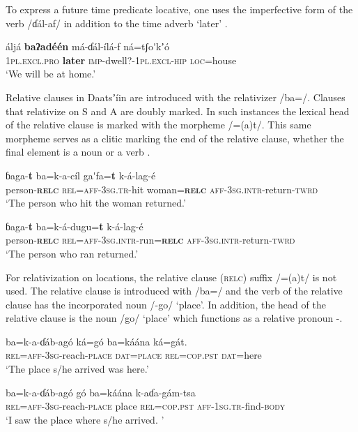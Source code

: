 \documentclass[output=paper]{langsci/langscibook}
\begin{document}
To express a future time predicate locative, one uses the imperfective form of the verb /ɗál-af/ in addition to the time adverb ‘later’ .

\ea\label{ex:ahlandc:81}
\gll
áljá    \textbf{baʔadéén}   má-ɗál-ílá-f                   ná=tʃo\'{ }kʼ\'{o} \\
\textsc{1pl.excl.pro}   \textbf{later}  \textsc{imp}{}-dwell?-\textsc{1pl.excl-hip} \textsc{loc}=house\\
\glt
‘We will be at home.’
\z

Relative clauses in Daatsʼíin are introduced with the relativizer /ba=/. Clauses that relativize on S and A are doubly marked. In such instances the lexical head of the relative clause is marked with the morpheme /=(a)t/. This same morpheme serves as a clitic marking the end of the relative clause, whether the final element is a noun  or a verb . 

\ea\label{ex:ahlandc:82}
\gll
ɓaga-\textbf{t}    ba=k-a-cíl    ga\'{ }fa=\textbf{t}  k-á-lag-é \\
person-\textbf{\textsc{relc}} \textsc{    rel=aff-3sg.tr}{}-hit  woman=\textbf{\textsc{relc}} \textsc{aff-3sg.intr}{}-return-\textsc{twrd}\\
\glt
‘The person who hit the woman returned.’
\z

\ea\label{ex:ahlandc:83}
\gll
ɓaga-\textbf{t}    ba=k-á-dugu=\textbf{t}    k-á-lag-é  \\
person-\textbf{\textsc{relc}} \textsc{    rel=aff-3sg.intr}{}-run=\textbf{\textsc{relc}} \textsc{aff-3sg.intr}{}-return-\textsc{twrd}\\
\glt
‘The person who ran returned.’
\z

For relativization on locations, the relative clause (\textsc{relc}) suffix /=(a)t/ is not used. The relative clause is introduced with /ba=/ and the verb of the relative clause has the incorporated noun /-go/ ‘place’.  In addition, the head of the relative clause is the noun /go/ ‘place’ which functions as a relative pronoun -.

\ea\label{ex:ahlandc:84}
\gll
ba=k-a-ɗáb-ag\'{o}  ká=g\'{o}  ba=káána  ká=gát. \\
\textsc{rel}\textsc{=aff-3sg}-reach-\textsc{place}  \textsc{dat=place}   \textsc{rel=cop.pst}  \textsc{dat}=here\\
\glt
 ‘The place s/he arrived was here.’
\z

\ea\label{ex:ahlandc:85}
\gll
ba=k-a-ɗáb-ag\'{o}    g\'{o}  ba=káána  k-aɗa-gám-tsa  \\
\textsc{rel=aff-3sg}{}-reach-\textsc{place}  place  \textsc{rel=cop.pst}   \textsc{aff-1sg.tr}{}-find-\textsc{body}\\
\glt
‘I saw the place where s/he arrived. ’
\z
\end{document}
